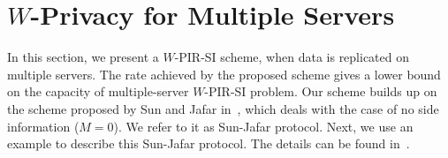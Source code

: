 \documentclass[letterpaper, 10 pt, conference]{ieeeconf}
\newcommand\salim[1]{\add[salim]{#1}}
\newcommand\salimn[1]{\notee[salim]{#1}}
\newcommand\swanand[1]{\notee[swanand]{#1}}
\begin{document}
\section{$W$-Privacy for Multiple Servers}
\label{sec:multi-message-pir}

\label{sec:achievability-modified-Sun-Jafar}

In this section, we present a $W$-PIR-SI scheme, when data is replicated on multiple servers. The rate achieved by the proposed scheme gives a lower bound on the capacity of multiple-server $W$-PIR-SI problem.
Our scheme builds up on the scheme proposed by Sun and Jafar in~\cite{sun2016capacitynoncol}, which deals with the case of no side information ($M=0$). We refer to it as Sun-Jafar protocol. Next, we use an example to  describe this Sun-Jafar protocol.  The details can be found in~\cite{sun2016capacitynoncol}.
\end{document}
